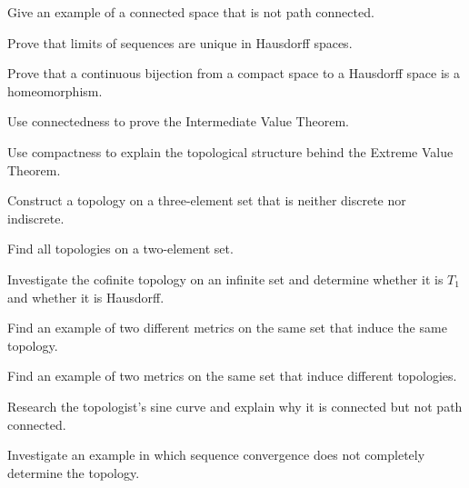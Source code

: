\begin{exercise}[3]
Give an example of a connected space that is not path connected.
\end{exercise}

\begin{exercise}[3]
Prove that limits of sequences are unique in Hausdorff spaces.
\end{exercise}

\begin{exercise}[3]
Prove that a continuous bijection from a compact space to a Hausdorff space
is a homeomorphism.
\end{exercise}

\begin{exercise}[3]
Use connectedness to prove the Intermediate Value Theorem.
\end{exercise}

\begin{exercise}[3]
Use compactness to explain the topological structure behind the Extreme
Value Theorem.
\end{exercise}

\begin{exercise}[4]
Construct a topology on a three-element set that is neither discrete nor
indiscrete.
\end{exercise}

\begin{exercise}[4]
Find all topologies on a two-element set.
\end{exercise}

\begin{exercise}[4]
Investigate the cofinite topology on an infinite set and determine whether
it is \(T_1\) and whether it is Hausdorff.
\end{exercise}

\begin{exercise}[4]
Find an example of two different metrics on the same set that induce the
same topology.
\end{exercise}

\begin{exercise}[4]
Find an example of two metrics on the same set that induce different
topologies.
\end{exercise}

\begin{exercise}[4]
Research the topologist's sine curve and explain why it is connected but not
path connected.
\end{exercise}

\begin{exercise}[4]
Investigate an example in which sequence convergence does not completely
determine the topology.
\end{exercise}

